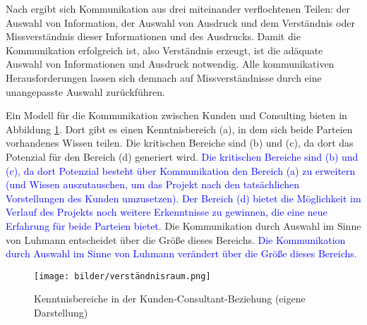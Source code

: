 \documentclass[../main.tex]{subfiles}
\begin{document}
Nach \textcite{luhmann1992communication} ergibt sich Kommunikation aus drei miteinander verflochtenen Teilen: der Auswahl von Information, der Auswahl von Ausdruck und dem Verständnis oder Missverständnis dieser Informationen und des Ausdrucks.
Damit die Kommunikation erfolgreich ist, also Verständnis erzeugt, ist die adäquate Auswahl von Informationen und Ausdruck notwendig.
Alle kommunikativen Herausforderungen lassen sich demnach auf Missverständnisse durch eine unangepasste Auswahl zurückführen.

Ein Modell für die Kommunikation zwischen Kunden und Consulting bieten \textcite{davis2006communication} in Abbildung \ref{fig:kenntnisbereich}.
Dort gibt es einen Kenntnisbereich (a), in dem sich beide Parteien vorhandenes Wissen teilen.
Die kritischen Bereiche sind (b) und (c), da dort das Potenzial für den Bereich (d) generiert wird.
\textcolor{blue}{Die kritischen Bereiche sind (b) und (c), da dort Potenzial besteht über Kommunikation den Bereich (a) zu erweitern (und Wissen auszutauschen, um das Projekt nach den tatsächlichen Vorstellungen des Kunden umzusetzen).
Der Bereich (d) bietet die Möglichkeit im Verlauf des Projekts noch weitere Erkenntnisse zu gewinnen, die eine neue Erfahrung für beide Parteien bietet.}
Die Kommunikation durch Auswahl im Sinne von Luhmann entscheidet über die Größe dieses Bereichs.
\textcolor{blue}{Die Kommunikation durch Auswahl im Sinne von Luhmann verändert über die Größe dieses Bereichs.}
\begin{figure}[H]
    \centering
    \texttt{[image: bilder/verständnisraum.png]}
    \caption{Kenntnisbereiche in der Kunden-Consultant-Beziehung (eigene Darstellung)}
    \label{fig:kenntnisbereich}
\end{figure}
\end{document}
